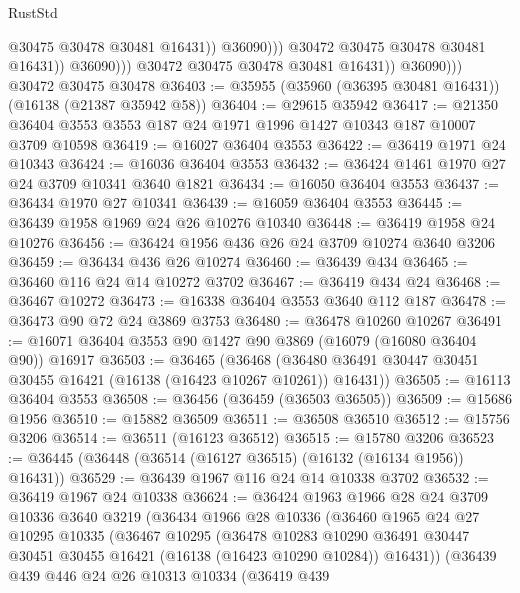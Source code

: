 \begin{lexlean}{RustStd}
\begin{coremodule}
                                  @30475
                                  @30478
                                  @30481
                                  @16431))
                              @36090)))
                        @30472
                        @30475
                        @30478
                        @30481
                        @16431))
                    @36090)))
              @30472
              @30475
              @30478
              @30481
              @16431))
          @36090)))
    @30472
    @30475
    @30478
@36403 := @35955 (@35960 (@36395 @30481 @16431)) (@16138 (@21387 @35942 @58))
@36404 := @29615 @35942
@36417 := @21350 @36404 @3553 @3553 @187 @24 @1971 @1996 @1427 @10343 @187 @10007 @3709 @10598
@36419 := @16027 @36404 @3553
@36422 := @36419 @1971 @24 @10343
@36424 := @16036 @36404 @3553
@36432 := @36424 @1461 @1970 @27 @24 @3709 @10341 @3640 @1821
@36434 := @16050 @36404 @3553
@36437 := @36434 @1970 @27 @10341
@36439 := @16059 @36404 @3553
@36445 := @36439 @1958 @1969 @24 @26 @10276 @10340
@36448 := @36419 @1958 @24 @10276
@36456 := @36424 @1956 @436 @26 @24 @3709 @10274 @3640 @3206
@36459 := @36434 @436 @26 @10274
@36460 := @36439 @434
@36465 := @36460 @116 @24 @14 @10272 @3702
@36467 := @36419 @434 @24
@36468 := @36467 @10272
@36473 := @16338 @36404 @3553 @3640 @112 @187
@36478 := @36473 @90 @72 @24 @3869 @3753
@36480 := @36478 @10260 @10267
@36491 := @16071 @36404 @3553 @90 @1427 @90 @3869 (@16079 (@16080 @36404 @90)) @16917
@36503 := @36465
    (@36468 (@36480 @36491 @30447 @30451 @30455 @16421 (@16138 (@16423 @10267 @10261)) @16431))
@36505 := @16113 @36404 @3553
@36508 := @36456 (@36459 (@36503 @36505))
@36509 := @15686 @1956
@36510 := @15882 @36509
@36511 := @36508 @36510
@36512 := @15756 @3206
@36514 := @36511 (@16123 @36512)
@36515 := @15780 @3206
@36523 := @36445 (@36448 (@36514 (@16127 @36515) (@16132 (@16134 @1956)) @16431))
@36529 := @36439 @1967 @116 @24 @14 @10338 @3702
@36532 := @36419 @1967 @24 @10338
@36624 := @36424
    @1963
    @1966
    @28
    @24
    @3709
    @10336
    @3640
    @3219
    (@36434
      @1966
      @28
      @10336
      (@36460
        @1965
        @24
        @27
        @10295
        @10335
        (@36467
          @10295
          (@36478
            @10283
            @10290
            @36491
            @30447
            @30451
            @30455
            @16421
            (@16138 (@16423 @10290 @10284))
            @16431))
        (@36439
          @439
          @446
          @24
          @26
          @10313
          @10334
          (@36419
            @439

\end{coremodule}
\end{lexlean}
